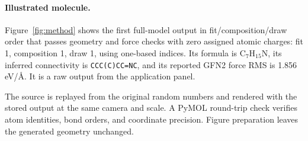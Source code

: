 \paragraph{Illustrated molecule.}
Figure~\ref{fig:method} shows the first full-model output in fit/composition/draw order that passes geometry and force checks with zero assigned atomic charges: fit 1, composition 1, draw 1, using one-based indices. Its formula is $\mathrm{C_7H_{15}N}$, its inferred connectivity is \texttt{CCC(C)CC=NC}, and its reported GFN2 force RMS is 1.856 eV/\AA. It is a raw output from the application panel.

The source is replayed from the original random numbers and rendered with the stored output at the same camera and scale. A PyMOL round-trip check verifies atom identities, bond orders, and coordinate precision. Figure preparation leaves the generated geometry unchanged.
